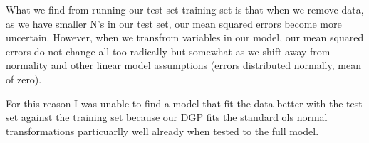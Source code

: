 \documentclass[12pt]{article}\usepackage[]{graphicx}\usepackage[]{color}
\begin{document}
\begin{flushleft}
What we find from running our test-set-training set is that when we remove data, as we have smaller N's in our test set, our mean squared errors become more uncertain. However, when we transfrom variables in our model, our mean squared errors do not change all too radically but somewhat as we shift away from normality and other linear model assumptions (errors distributed normally, mean of zero). 

For this reason I was unable to find a model that fit the data better with the test set against the training set because our DGP fits the standard ols normal transformations particuarlly well already when tested to the full model.












\end{flushleft}
\end{document}
